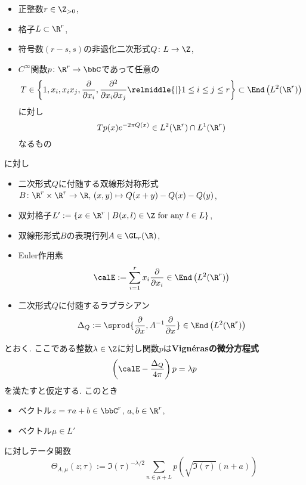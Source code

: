 \documentclass[11pt,b5paper,oneside,lualatex]{ltjsarticle} %
\numberwithin{equation}{section} %
\begin{document}
\begin{thm}
	\label{thm:Vigneras}
	\leavevmode %
	\begin{itemize}
		\item 正整数$ r \in \Z_{>0} $,
		\item 格子$ L \subset \R^r $,
		\item 符号数$ (r-s, s) $の非退化二次形式$ Q \colon L \to \Z $,
		\item $ C^\infty $関数$ p \colon \R^r \to \bbC $であって任意の
		\[
		T \in 
		\left\{ 1, x_i, x_i x_j, \frac{\partial}{\partial x_i}, \frac{\partial^2}{\partial x_i \partial x_j}
		 \relmiddle{|} 1 \le i \le j \le r \right\}
		\subset \End \left( L^2(\R^r) \right)
		\]
		に対し
		\[
		T p(x) e^{-2\pi Q(x)} %
		\in L^2(\R^r) \cap L^1(\R^r)
		\]
		なるもの
	\end{itemize}
	に対し
	\begin{itemize}
		\item 二次形式$ Q $に付随する双線形対称形式$ B \colon \R^r \times \R^r \to \R, \, (x, y) \mapsto Q(x+y) - Q(x) - Q(y) $,
		\item 双対格子$ L' := \{ x \in \R^r \mid B(x, l) \in \Z \text{ for any } l \in L \} $,
		\item 双線形形式$ B $の表現行列$ A \in \GL_r(\R) $,
		\item Euler作用素
		\[
		\calE := \sum_{i=1}^{r} x_i \frac{\partial}{\partial x_i}
		\in \End \left( L^2(\R^r) \right)
		\]
		\item 二次形式$ Q $に付随するラプラシアン
		\[
		\Delta_Q := \sprod{ \frac{\partial}{\partial x}, A^{-1} \frac{\partial}{\partial x} }
		\in \End \left( L^2(\R^r) \right)
		\]
	\end{itemize}
	とおく. 
	ここである整数$ \lambda \in \Z $に対し関数$ p $は\textbf{Vign\'{e}rasの微分方程式}
	\[
	\left( \calE - \frac{\Delta_Q}{4\pi} \right) p = \lambda p
	\]
	を満たすと仮定する. 
	このとき
	\begin{itemize}
		\item ベクトル$ z = \tau a + b \in \bbC^r $, $ a, b \in \R^r $,
		\item ベクトル$ \mu \in L' $
	\end{itemize}
	に対しテータ関数
	\[
	\Theta_{A, \mu} (z; \tau)
	:=
	\Im(\tau)^{-\lambda/2}
	\sum_{n \in \mu + L} p\left( \sqrt{\Im(\tau)} \left( n + a \right) \right)
\]
\end{thm}
\end{document}
